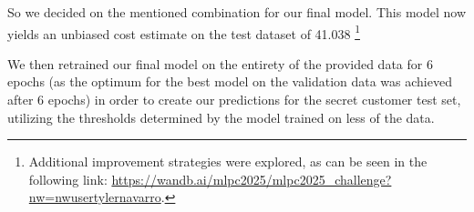 So we decided on the mentioned combination for our final model. This model now yields an unbiased cost estimate on the test dataset of 41.038 \footnote{Additional improvement strategies were explored, as can be seen in the following link: \url{https://wandb.ai/mlpc2025/mlpc2025_challenge?nw=nwusertylernavarro}.}

We then retrained our final model on the entirety of the provided data for 6 epochs (as the optimum for the best model on the validation data was achieved after 6 epochs) in order to create our predictions for the secret customer test set, utilizing the thresholds determined by the model trained on less of the data.


